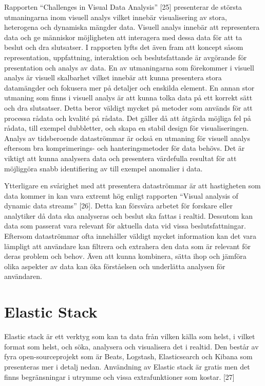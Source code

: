 \documentclass[12pt]{kththesis}
\begin{document}
Rapporten “Challenges in Visual Data Analysis” [25] presenterar de största utmaningarna inom visuell analys vilket innebär visualisering av stora, heterogena och dynamiska mängder data. Visuell analys innebär att representera data och ge människor möjligheten att interagera med dessa data för att ta beslut och dra slutsatser. I rapporten lyfts det även fram att koncept såsom representation, uppfattning, interaktion och beslutsfattande är avgörande för presentation och analys av data. En av utmaningarna som förekommer i visuell analys är visuell skalbarhet vilket innebär att kunna presentera stora datamängder och fokusera mer på detaljer och enskilda element. En annan stor utmaning som finns i visuell analys är att kunna tolka data på ett korrekt sätt och dra slutsatser. Detta beror väldigt mycket på metoder som används för att processa rådata och kvalité på rådata. Det gäller då att åtgärda möjliga fel på rådata, till exempel dubbletter, och skapa en stabil design för visualiseringen. Analys av tidsberoende dataströmmar är också en utmaning för visuell analys eftersom bra komprimerings- och hanteringsmetoder för data behövs. Det är viktigt att kunna analysera data och presentera värdefulla resultat för att möjliggöra snabb identifiering av till exempel anomalier i data. 

Ytterligare en svårighet med att presentera dataströmmar är att hastigheten som data kommer in kan vara extremt hög enligt rapporten “Visual analysis of dynamic data streams” [26]. Detta kan försvåra arbetet för forskare eller analytiker då data ska analyseras och beslut ska fattas i realtid. Dessutom kan data som passerat vara relevant för aktuella data vid vissa beslutsfattningar. Eftersom dataströmmar ofta innehåller väldigt mycket information kan det vara lämpligt att användare kan filtrera och extrahera den data som är relevant för deras problem och behov. Även att kunna kombinera, sätta ihop och jämföra olika aspekter av data kan öka förståelsen och underlätta analysen för användaren. 

\section{Elastic Stack} 

Elastic stack är ett verktyg som kan ta data från vilken källa som helst, i vilket format som helst, och söka, analysera och visualisera det i realtid. Den består av fyra open-sourceprojekt som är Beats, Logstash, Elasticsearch och Kibana som presenteras mer i detalj nedan. Användning av Elastic stack är gratis men det finns begränsningar i utrymme och vissa extrafunktioner som kostar. [27]
\end{document}
